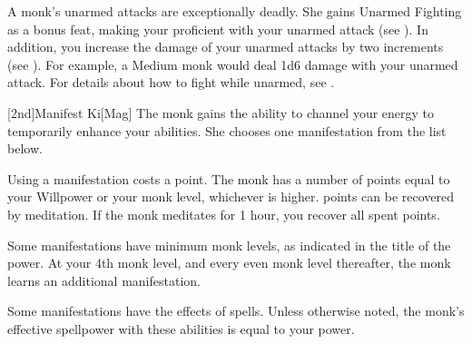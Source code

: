         A monk's unarmed attacks are exceptionally deadly.
        She gains Unarmed Fighting as a bonus feat, making your proficient with your unarmed attack (see ).
        In addition, you increase the damage of your unarmed attacks by two increments (see ).
        For example, a Medium monk would deal 1d6 damage with your unarmed attack.
        For details about how to fight while unarmed, see .

        [2nd]{Manifest Ki}[Mag]
        The monk gains the ability to channel your \ki energy to temporarily enhance your abilities.
        She chooses one \ki manifestation from the list below.

        Using a \ki manifestation costs a \ki point.
        The monk has a number of \ki points equal to your Willpower or your monk level, whichever is higher.
        \Ki points can be recovered by meditation.
        If the monk meditates for 1 hour, you recover all spent \ki points.

        Some \ki manifestations have minimum monk levels, as indicated in the title of the power.
        At your 4th monk level, and every even monk level thereafter, the monk learns an additional \ki manifestation.

        Some \ki manifestations have the effects of spells.
        Unless otherwise noted, the monk's effective spellpower with these abilities is equal to your \ki power.

